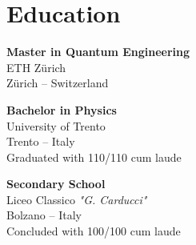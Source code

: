 \documentclass[a4paper,10pt]{article}
\begin{document}
\begin{adjustbox}{valign=t}
\begin{minipage}{0.3\textwidth}
\vfill

\section*{Education}
	\begin{description}
	\raggedright
	\item [\normalfont \textcolor{ColorTwo}{2021 - Now}]
    \textbf{Master in Quantum Engineering}\\
	ETH Zürich\\
	Zürich -- Switzerland

	\item [\normalfont \textcolor{ColorTwo}{2018 - 2021}] \textbf{Bachelor in
	Physics}\\
	University of Trento\\
	Trento -- Italy\\
    \small{Graduated with 110/110 cum laude}
    \normalsize

	\item [\normalfont \textcolor{ColorTwo}{2013 - 2018}] \textbf{Secondary School}\\ 
	Liceo Classico \textit{"G. Carducci"} \\
	Bolzano -- Italy \\
    \small{Concluded with 100/100 cum laude} \normalsize
\end{description}

\vfill
\end{minipage}
\end{adjustbox}
%
%
%
\hfill
\begin{adjustbox}{valign=t}
\begin{minipage}{0.05\textwidth} %
\MyVerticalRule  %
\end{minipage}
\end{adjustbox}
\hfill
%
\end{document}
